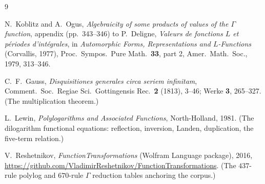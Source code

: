 \documentclass[11pt]{article}
\theoremstyle{remark}
\begin{document}
\begin{thebibliography}{9}

N.~Koblitz and A.~Ogus, \emph{Algebraicity of some products of values of the $\Gamma$
function}, appendix (pp.~343--346) to P.~Deligne, \emph{Valeurs de fonctions $L$ et
p\'eriodes d'int\'egrales}, in \emph{Automorphic Forms, Representations and
$L$-Functions} (Corvallis, 1977), Proc.\ Sympos.\ Pure Math.\ \textbf{33}, part 2,
Amer.\ Math.\ Soc., 1979, 313--346.

C.~F.~Gauss, \emph{Disquisitiones generales circa seriem infinitam}, Comment.\ Soc.\
Regiae Sci.\ Gottingensis Rec.\ \textbf{2} (1813), 3--46; Werke \textbf{3}, 265--327.
(The multiplication theorem.)

L.~Lewin, \emph{Polylogarithms and Associated Functions}, North-Holland, 1981.
(The dilogarithm functional equations: reflection, inversion, Landen, duplication, the
five-term relation.)

V.~Reshetnikov, \emph{FunctionTransformations} (Wolfram Language package), 2016,
\url{https://github.com/VladimirReshetnikov/FunctionTransformations}. (The $437$-rule
polylog and $670$-rule $\Gamma$ reduction tables anchoring the corpus.)

\end{thebibliography}
\end{document}
